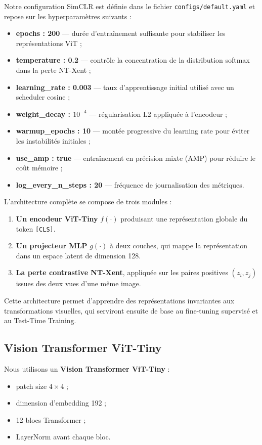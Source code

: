 \documentclass[12pt,a4paper]{report}
\begin{document}
	Notre configuration SimCLR est définie dans le fichier \texttt{configs/default.yaml} et repose sur les hyperparamètres suivants :
	\begin{itemize}
		\item \textbf{epochs : 200} — durée d’entraînement suffisante pour stabiliser les représentations ViT ;
		\item \textbf{temperature : 0.2} — contrôle la concentration de la distribution softmax dans la perte NT-Xent ;
		\item \textbf{learning\_rate : 0.003} — taux d’apprentissage initial utilisé avec un scheduler cosine ;
		\item \textbf{weight\_decay : $10^{-4}$} — régularisation L2 appliquée à l’encodeur ;
		\item \textbf{warmup\_epochs : 10} — montée progressive du learning rate pour éviter les instabilités initiales ;
		\item \textbf{use\_amp : true} — entraînement en précision mixte (AMP) pour réduire le coût mémoire ;
		\item \textbf{log\_every\_n\_steps : 20} — fréquence de journalisation des métriques.
	\end{itemize}
	
	L’architecture complète se compose de trois modules :
	\begin{enumerate}
		\item \textbf{Un encodeur ViT-Tiny} $f(\cdot)$ produisant une représentation globale du token \texttt{[CLS]}.
		\item \textbf{Un projecteur MLP} $g(\cdot)$ à deux couches, qui mappe la représentation dans un espace latent de dimension 128.
		\item \textbf{La perte contrastive NT-Xent}, appliquée sur les paires positives $(z_i, z_j)$ issues des deux vues d’une même image.
	\end{enumerate}
	
	Cette architecture permet d’apprendre des représentations invariantes aux transformations visuelles, qui serviront ensuite de base au fine-tuning supervisé et au Test-Time Training.
	
	\subsection{Vision Transformer ViT-Tiny}
	Nous utilisons un \textbf{Vision Transformer ViT-Tiny} :
	\begin{itemize}
		\item patch size $4\times4$ ;
		\item dimension d’embedding 192 ;
		\item 12 blocs Transformer ;
		\item LayerNorm avant chaque bloc.
	\end{itemize}
	
\end{document}
